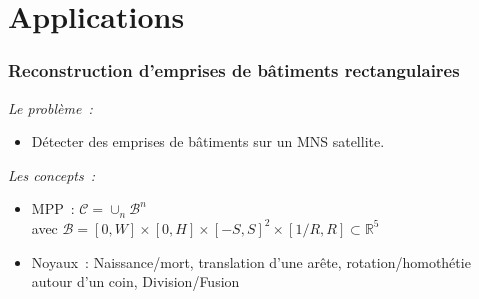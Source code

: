 \documentclass{beamer}
\begin{document}
\section{Applications}

\begin{frame}
\frametitle{Reconstruction d'emprises de bâtiments rectangulaires}
\emph{Le probl\`eme~:} 
\begin{itemize}
\item Détecter des emprises de bâtiments sur un MNS satellite.
\end{itemize}
\emph{Les concepts~:}
\begin{itemize}
\item MPP~:  $\mathcal{C} = \cup_{n}\mathcal{B}^n$\\
avec $\mathcal{B}=[0,W]\times[0,H]\times[-S,S]^2\times[1/R,R] \subset  \mathds{R}^{5}$
\item Noyaux~: Naissance/mort, translation d'une arête, rotation/homothétie autour d'un coin, Division/Fusion
\end{itemize}


\end{frame}
\end{document}
